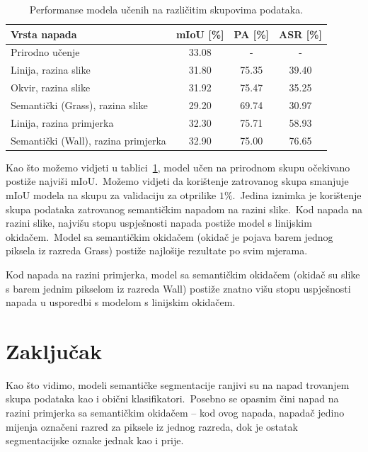 \documentclass[times, utf8, seminar, numeric]{fer}
\begin{document}
\begin{table}[htb]
    \caption{Performanse modela učenih na različitim skupovima podataka.}
    \label{tbl:performanse_zatrovano}
    \centering
    \begin{tabular}{lccc} \hline
    Vrsta napada & mIoU [\%] & PA [\%] & ASR [\%] \\ \hline
    Prirodno učenje & 33.08 & - & - \\
    Linija, razina slike & 31.80 & 75.35 & 39.40 \\
    Okvir, razina slike & 31.92 & 75.47 & 35.25 \\
    Semantički (Grass), razina slike & 29.20 & 69.74 & 30.97 \\
    Linija, razina primjerka & 32.30 & 75.71 & 58.93 \\
    Semantički (Wall), razina primjerka & 32.90 & 75.00 & 76.65 \\ \hline
    \end{tabular}
\end{table}

Kao što možemo vidjeti u tablici~\ref{tbl:performanse_zatrovano}, model učen na prirodnom skupu očekivano postiže najviši mIoU.\ 
Možemo vidjeti da korištenje zatrovanog skupa smanjuje mIoU modela na skupu za validaciju za otprilike $1\%$.\ Jedina iznimka je korištenje skupa podataka zatrovanog semantičkim napadom na razini slike.\ 
Kod napada na razini slike, najvišu stopu uspješnosti napada postiže model s linijskim okidačem.\ Model sa semantičkim okidačem (okidač je pojava barem jednog piksela iz razreda Grass) postiže najlošije rezultate po svim mjerama.

Kod napada na razini primjerka, model sa semantičkim okidačem (okidač su slike s barem jednim pikselom iz razreda Wall) postiže znatno višu stopu uspješnosti napada u usporedbi s modelom s linijskim okidačem.


\chapter{Zaključak}

Kao što vidimo, modeli semantičke segmentacije ranjivi su na napad trovanjem skupa podataka kao i obični klasifikatori.\ 
Posebno se opasnim čini napad na razini primjerka sa semantičkim okidačem – kod ovog napada, napadač jedino mijenja označeni razred za piksele iz jednog razreda, dok je ostatak segmentacijske oznake jednak kao i prije.



\end{document}
